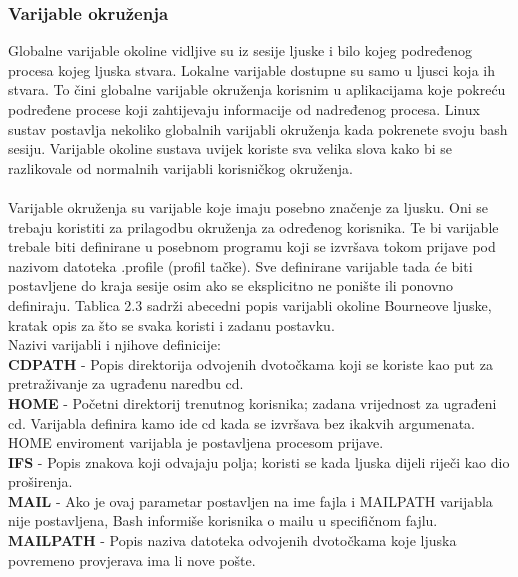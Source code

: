 \documentclass[11pt]{book}
\begin{document}
\subsubsection{Varijable okruženja}
Globalne varijable okoline vidljive su iz sesije ljuske i bilo kojeg podređenog procesa
kojeg ljuska stvara. Lokalne varijable dostupne su samo u ljusci koja ih stvara. To čini globalne
varijable okruženja korisnim u aplikacijama koje pokreću podređene procese koji zahtijevaju
informacije od nadređenog procesa. Linux sustav postavlja nekoliko globalnih varijabli
okruženja kada pokrenete svoju bash sesiju. Varijable okoline sustava uvijek koriste sva velika
slova kako bi se razlikovale od normalnih varijabli korisničkog okruženja.\\\\
Varijable okruženja su varijable koje imaju posebno značenje za ljusku. Oni se trebaju koristiti za prilagodbu okruženja za određenog korisnika. Te bi varijable trebale biti definirane u posebnom programu koji se izvršava tokom prijave pod nazivom datoteka .profile (profil tačke). Sve definirane varijable tada će biti postavljene do kraja sesije osim ako se eksplicitno ne ponište ili ponovno definiraju. Tablica 2.3 sadrži abecedni popis varijabli okoline Bourneove ljuske, kratak opis za što se svaka koristi i zadanu postavku.\\

Nazivi varijabli i njihove definicije:\\

\textbf{CDPATH} - Popis direktorija odvojenih dvotočkama koji se koriste kao put za pretraživanje za ugrađenu naredbu cd.\\

\textbf{HOME} - Početni direktorij trenutnog korisnika; zadana vrijednost za ugrađeni cd. Varijabla definira kamo ide cd kada se izvršava bez ikakvih argumenata. HOME enviroment varijabla je postavljena procesom prijave.\\

\textbf{IFS} - Popis znakova koji odvajaju polja; koristi se kada ljuska dijeli riječi kao dio proširenja.\\

\textbf{MAIL} - Ako je ovaj parametar postavljen na ime fajla i MAILPATH varijabla nije postavljena, Bash informiše korisnika o mailu u specifičnom fajlu.\\

\textbf{MAILPATH} - Popis naziva datoteka odvojenih dvotočkama koje ljuska povremeno provjerava ima li nove pošte.\\ 
\end{document}
